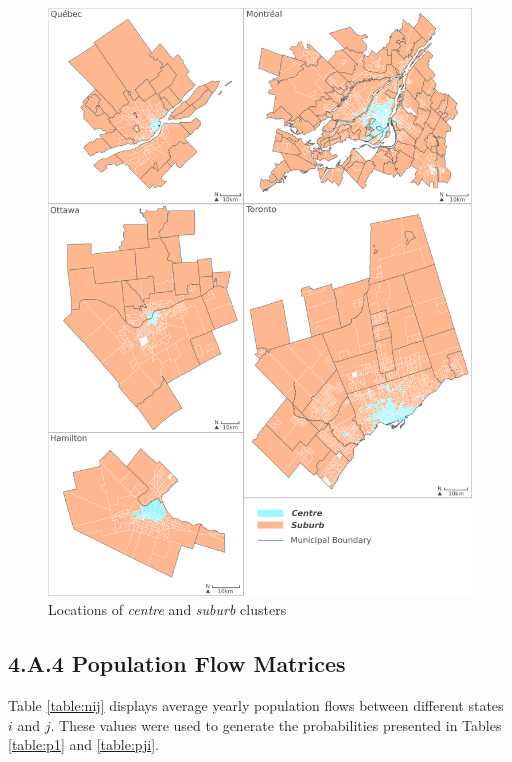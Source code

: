 \begin{figure}[H]
	\centering
	\includegraphics[width=6in]{figures/E_mini_1.png}
	\caption{Locations of \textit{centre} and \textit{suburb} clusters}
	\label{fig:mm2}
\end{figure}





\subsection*{4.A.4 \hspace{2mm} Population Flow Matrices}




Table \ref{table:nij} displays average yearly population flows between different states $i$ and $j$. These values were used to generate the probabilities presented in Tables \ref{table:p1} and \ref{table:pji}.



